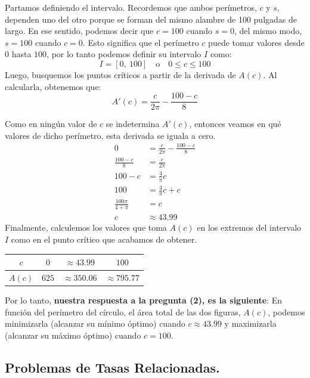 \documentclass[12pt]{article}
\begin{document}
Partamos definiendo el intervalo. Recordemos que ambos perímetros, $c$ y $s$, dependen uno del otro porque se forman del mismo alambre de 100 pulgadas de largo. En ese sentido, podemos decir que $c = 100$ cuando $s = 0$, del mismo modo, $s = 100$ cuando $c = 0$. Esto significa que el perímetro $c$ puede tomar valores desde $0$ hasta $100$, por lo tanto podemos definir su intervalo $I$ como:
\[
	I = [0, \ 100] \quad \text{o} \quad 0 \leq c \leq 100
\]
Luego, busquemos los puntos críticos a partir de la derivada de $A(c)$. Al calcularla, obtenemos que:
\[
	A'(c) = \frac{c}{2\pi} - \frac{100-c}{8}
\]

\newpage

Como en ningún valor de $c$ se indetermina $A'(c)$, entonces veamos en qué valores de dicho perímetro, esta derivada se iguala a cero.
\begin{align*}
0 &= \frac{c}{2\pi} - \frac{100-c}{8} \\
\frac{100 - c}{8} &= \frac{c}{2\pi} \\
100 - c &= \frac{4}{\pi} c \\
100 &= \frac{4}{\pi} c + c \\
\frac{100 \pi}{4 + \pi} &= c \\
c &\approx 43.99
\end{align*}
Finalmente, calculemos los valores que toma $A(c)$ en los extremos del intervalo $I$ como en el punto crítico que acabamos de obtener.

\begin{table}[hbt!]
\centering

\begin{tabular}{c | c c c}
$c$ & $0$ & $\approx 43.99$ & $100$ \\
\hline
$A(c)$ & $625$ & $\approx 350.06$ & $\approx 795.77$
\end{tabular}

\end{table}

Por lo tanto, \textbf{nuestra respuesta a la pregunta (2), es la siguiente}: En función del perímetro del círculo, el área total de las dos figuras, $A(c)$, podemos minimizarla (alcanzar su mínimo óptimo) cuando $c \approx 43.99$ y maximizarla (alcanzar su máximo óptimo) cuando $c = 100$.




\subsection{Problemas de Tasas Relacionadas.}
\end{document}
